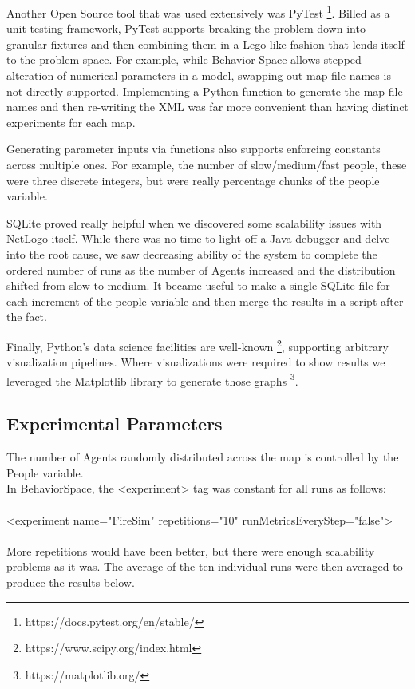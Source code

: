 \documentclass[12pt,letterpaper]{article}
\begin{document}
Another Open Source tool that was used extensively was PyTest \footnote{https://docs.pytest.org/en/stable/}. Billed as a
unit testing framework, PyTest supports breaking the problem down into granular
fixtures and then combining them in a Lego-like fashion that lends itself to the
problem space. For example, while Behavior Space allows stepped alteration of
numerical parameters in a model, swapping out map file names is not directly
supported. Implementing a Python function to generate the map file names and
then re-writing the XML was far more convenient than having distinct
experiments for each map.

Generating parameter inputs via functions also supports enforcing constants
across multiple ones. For example, the number of slow/medium/fast people, these
were three discrete integers, but were really percentage chunks of the people
variable.


SQLite proved really helpful when we discovered some scalability issues with
NetLogo itself. While there was no time to light off a Java debugger and delve
into the root cause, we saw decreasing ability of the system to complete the
ordered number of runs as the number of Agents increased and the distribution
shifted from slow to medium. It became useful to make a single SQLite file for
each increment of the people variable and then merge the results in a script
after the fact.

Finally, Python's data science facilities are well-known \footnote{https://www.scipy.org/index.html}, supporting arbitrary visualization pipelines.  Where visualizations were required to show results we leveraged the Matplotlib library to generate those graphs \footnote{ https://matplotlib.org/}.

\subsection{Experimental Parameters}
The number of Agents randomly distributed across the map is controlled by the
People variable. \\
In BehaviorSpace, the <experiment> tag was constant for all runs as follows:\\
\\
  <experiment name="FireSim" repetitions="10" runMetricsEveryStep="false">\\
\\
More repetitions would have been better, but there were enough scalability
problems as it was. The average of the ten individual runs were then averaged to
produce the results below.\\
\end{document}
